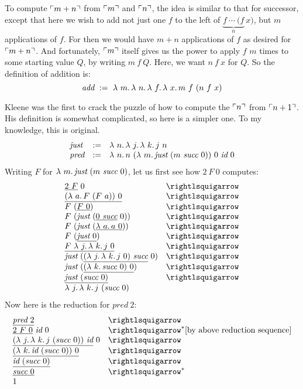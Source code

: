   To compute $\ulcorner m+n \urcorner$ from $\ulcorner m \urcorner$ and $\ulcorner n \urcorner$, the idea is similar to that for successor, except
that here we wish to add not just one $f$ to the left of $\underbrace{f \ \cdots\  (f }_{n}\ x)$, but $m$ applications of $f$.  For
then we would have $m+n$ applications of $f$ as desired for $\ulcorner m+n \urcorner$.  And fortunately, $\ulcorner m \urcorner$ itself gives us the power
to apply $f$ $m$ times to some starting value $Q$, by writing $m\ f\ Q$.  Here, we want $n\ f\ x$ for $Q$.  So the definition
of addition is:
\[
\textit{add} \ := \ \lam{m}{\lam{n}{\lam{f}{\lam{x}{m\ f\ (n\ f\ x)}}}}
\]

 Kleene was the first to crack the puzzle of how to compute the $\ulcorner n \urcorner$ from $\ulcorner n+1 \urcorner$.
His definition is somewhat complicated, so here is a simpler one.  To my knowledge, this is original.  
\[
\begin{array}{lll}
\textit{just} & := & \lam{n}{\lam{j}{\lam{k}{j\ n}}} \\
\textit{pred} & := & \lam{n}{n\ (\lam{m}{\textit{just}\ (m\ \textit{succ}\ 0)})\ 0\ \textit{id}\ 0}
\end{array}
\]
\noindent Writing $F$ for $\lam{m}{\textit{just}\ (m\ \textit{succ}\ 0)}$, let us first see how $2\ F\ 0$ computes:
\[
\begin{array}{ll}
  \underline{2\ F}\ 0 & \betaa \\
  \underline{(\lam{a}{F\ (F\ a)})\ 0} & \betaa \\
  F\ (\underline{F\ 0}) & \betaa \\
  F\ (\textit{just}\ (\underline{0\ \textit{succ}}\ 0)) & \betaa \\
  F\ (\textit{just}\ (\underline{\lam{a}{a}\ 0})) & \betaa \\
  F\ (\underline{\textit{just}\ 0}) & \betaa \\
  \underline{F\ \lam{j}{\lam{k}{j\ 0}}} & \betaa \\    
  \textit{just}\ (\underline{(\lam{j}{\lam{k}{j\ 0}})\ \textit{succ}}\ 0) & \betaa \\
  \textit{just}\ (\underline{(\lam{k}{\textit{succ}\ 0})\ 0}) & \betaa \\
  \underline{\textit{just}\ (\textit{succ}\ 0)} & \betaa \\
  \lam{j}{\lam{k}{j\ (\textit{succ}\ 0)}} & \ 
\end{array}
\]
\noindent Now here is the reduction for $\textit{pred}\ 2$:
\[
\begin{array}{ll}
  \underline{\textit{pred}\ 2} & \betaa \\
  \underline{2\ F\ 0}\ \textit{id}\ 0 & \betaa^* \textnormal{[by above reduction sequence]}\\
  \underline{(\lam{j}{\lam{k}{j\ (\textit{succ}\ 0)}})\ \textit{id}}\ 0 & \betaa \\
  \underline{(\lam{k}{\textit{id}\ (\textit{succ}\ 0)})\ 0} & \betaa \\
  \underline{\textit{id}\ (\textit{succ}\ 0)} & \betaa \\
  \underline{\textit{succ}\ 0} & \betaa^* \\
  1 &\ 
\end{array}
\]
  

